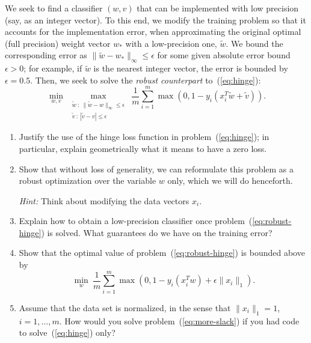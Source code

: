 \documentclass[11pt]{article}
\begin{document}
We seek to find a classifier $(w,v)$ that can be implemented with low precision (say, as an integer vector). To this end, we modify the training problem so that it accounts for the implementation error, when approximating the original optimal (full precision) weight vector $w_*$ with a low-precision one, $\tilde{w}$.  We bound the corresponding error as $\|\tilde{w}-w_*\|_\infty \le \epsilon$ for some given absolute error bound $\epsilon >0$; for example, if $\tilde{w}$ is the nearest integer vector, the error is bounded by $\epsilon = 0.5$. Then, we seek to solve the \emph{robust counterpart} to~(\ref{eq:hinge}):
\begin{equation}\label{eq:robust-hinge}
    \min_{w,v} \: \max_{\substack{\tilde{w} \::\: \|\tilde{w}-w\|_\infty \le \epsilon \\ \tilde{v} \::\: |\tilde{v}-v| \le \epsilon}} \: \frac{1}{m}
    \sum_{i=1}^m \max(0, 1-y_i(x_i^T\tilde{w} + \tilde{v}) ).
\end{equation}
\begin{enumerate}
    \item Justify the use of the hinge loss function in problem~(\ref{eq:hinge}); in particular, explain geometrically what it means to have a zero loss.

    \item Show that without loss of generality, we can reformulate this problem as a robust optimization over the variable $w$ only, which we will do henceforth.

    {\em Hint:} Think about modifying the data vectors $x_i$.

    \item Explain how to obtain a low-precision classifier once problem~(\ref{eq:robust-hinge}) is solved. What guarantees do we have on the training error?

    \item Show that the optimal value of problem~(\ref{eq:robust-hinge}) is bounded above by
\begin{equation}\label{eq:more-slack}
    \min_{w} \: \frac{1}{m}\sum_{i=1}^m \max(0, 1-y_i(x_i^Tw)+\epsilon \|x_i\|_1).
\end{equation}

\item Assume that the data set is normalized, in the sense that $\|x_i\|_1 = 1$, $i=1,\ldots,m$. How would you solve problem~(\ref{eq:more-slack}) if you had code to solve~(\ref{eq:hinge}) only?
\end{enumerate}

\begin{solution}
\end{solution}
\end{document}
